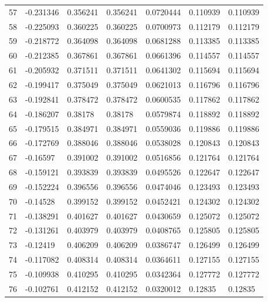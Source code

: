 \begin{longtable}{l|lll|lll}
  57 & -0.231346    & 0.356241    & 0.356241    &  0.0720444   & 0.110939    & 0.110939    \\
  58 & -0.225093    & 0.360225    & 0.360225    &  0.0700973   & 0.112179    & 0.112179    \\
  59 & -0.218772    & 0.364098    & 0.364098    &  0.0681288   & 0.113385    & 0.113385    \\
  60 & -0.212385    & 0.367861    & 0.367861    &  0.0661396   & 0.114557    & 0.114557    \\
  61 & -0.205932    & 0.371511    & 0.371511    &  0.0641302   & 0.115694    & 0.115694    \\
  62 & -0.199417    & 0.375049    & 0.375049    &  0.0621013   & 0.116796    & 0.116796    \\
  63 & -0.192841    & 0.378472    & 0.378472    &  0.0600535   & 0.117862    & 0.117862    \\
  64 & -0.186207    & 0.38178     & 0.38178     &  0.0579874   & 0.118892    & 0.118892    \\
  65 & -0.179515    & 0.384971    & 0.384971    &  0.0559036   & 0.119886    & 0.119886    \\
  66 & -0.172769    & 0.388046    & 0.388046    &  0.0538028   & 0.120843    & 0.120843    \\
  67 & -0.16597     & 0.391002    & 0.391002    &  0.0516856   & 0.121764    & 0.121764    \\
  68 & -0.159121    & 0.393839    & 0.393839    &  0.0495526   & 0.122647    & 0.122647    \\
  69 & -0.152224    & 0.396556    & 0.396556    &  0.0474046   & 0.123493    & 0.123493    \\
  70 & -0.14528     & 0.399152    & 0.399152    &  0.0452421   & 0.124302    & 0.124302    \\
  71 & -0.138291    & 0.401627    & 0.401627    &  0.0430659   & 0.125072    & 0.125072    \\
  72 & -0.131261    & 0.403979    & 0.403979    &  0.0408765   & 0.125805    & 0.125805    \\
  73 & -0.12419     & 0.406209    & 0.406209    &  0.0386747   & 0.126499    & 0.126499    \\
  74 & -0.117082    & 0.408314    & 0.408314    &  0.0364611   & 0.127155    & 0.127155    \\
  75 & -0.109938    & 0.410295    & 0.410295    &  0.0342364   & 0.127772    & 0.127772    \\
  76 & -0.102761    & 0.412152    & 0.412152    &  0.0320012   & 0.12835     & 0.12835     \\

\end{longtable}
